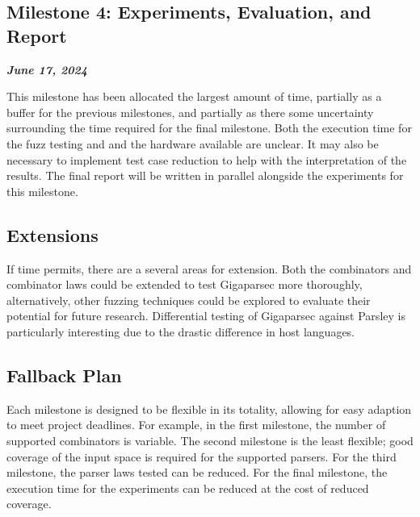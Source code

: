 \documentclass[11pt]{article}
\newcommand{\be}[1]{\textbf{\emph{#1}}}
\begin{document}
\subsection{Milestone 4: Experiments, Evaluation, and Report}
\be{June 17, 2024}

This milestone has been allocated the largest amount of time, partially as a buffer for the previous milestones, and partially as there some uncertainty surrounding the time required for the final milestone. Both the execution time for the fuzz testing and and the hardware available are unclear. It may also be necessary to implement test case reduction to help with the interpretation of the results. The final report will be written in parallel alongside the experiments for this milestone.

\subsection{Extensions}

If time permits, there are a several areas for extension. Both the combinators and combinator laws could be extended to test Gigaparsec more thoroughly, alternatively, other fuzzing techniques could be explored to evaluate their potential for future research. Differential testing of Gigaparsec against Parsley is particularly interesting due to the drastic difference in host languages.

\subsection{Fallback Plan}
Each milestone is designed to be flexible in its totality, allowing for easy adaption to meet project deadlines. For example, in the first milestone, the number of supported combinators is variable. The second milestone is the least flexible; good coverage of the input space is required for the supported parsers. For the third milestone, the parser laws tested can be reduced. For the final milestone, the execution time for the experiments can be reduced at the cost of reduced coverage.

\raggedright

\end{document}

